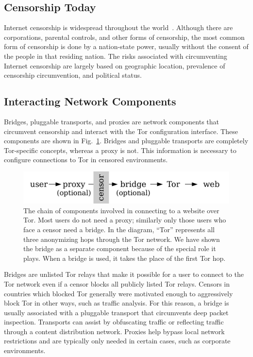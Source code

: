 \documentclass[USenglish,oneside,twocolumn]{article}
\begin{document}
\subsection{Censorship Today} 
Internet censorship is widespread throughout the world~\cite{faris2008measuring}. Although there are corporations, parental controls, and other forms of censorship, the most common form of censorship is done by a nation-state power, usually without the consent of the people in that residing nation. The risks associated with circumventing Internet censorship are largely based on geographic location, prevalence of censorship circumvention, and political status. 

\subsection{Interacting Network Components} 
\label{sec:components}
Bridges, pluggable transports, and proxies are network components that 
circumvent censorship and interact with the Tor configuration interface. 
These components are shown in Fig.~\ref{fig:topology}.
Bridges and pluggable transports are completely Tor-specific concepts, whereas a proxy is not.  
This information is necessary to configure connections to Tor in censored environments. 

\begin{figure}
\centering
\includegraphics{topology}
\caption{
The chain of components involved in connecting to a website over Tor.
Most users do not need a proxy;
similarly only those users who face a censor need a bridge.
In the diagram, ``Tor'' represents all three anonymizing hops through the Tor network.
We have shown the bridge as a separate component
because of the special role it plays.
When a bridge is used, it takes the place of the first Tor hop.
}
\label{fig:topology}
\end{figure}

Bridges are unlisted Tor relays that make it possible for a user to connect
to the Tor network even if a censor blocks all publicly listed Tor relays. 
Censors in countries which blocked Tor generally were motivated enough to aggressively
block Tor in other ways, such as traffic analysis. For this reason, a bridge is usually associated
with a pluggable transport that circumvents deep packet inspection. Transports can
assist by obfuscating traffic or reflecting traffic through a content distribution network. 
Proxies help bypass local network restrictions and are typically only
needed in certain cases, such as corporate environments.
\end{document}

